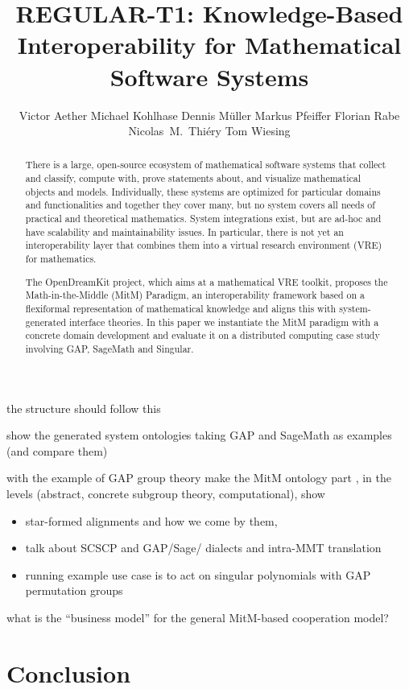 \documentclass{llncs}
\title{REGULAR-T1: Knowledge-Based Interoperability for Mathematical Software Systems}
\author{
Victor Aether\inst{2} 
 Michael Kohlhase\inst{1} 
Dennis M\"uller\inst{1} 
Markus Pfeiffer\inst{2} 
Florian Rabe\inst{2} 
Nicolas~M.~Thiéry\inst{3} 
Tom Wiesing\inst{2}
}
\institute{
   FAU Erlangen-N\"urnberg
   \and University of St~Andrews 
   \and Universit\'e Paris-Sud
}
\begin{document}
\maketitle
\begin{abstract}
  There is a large, open-source ecosystem of mathematical software systems that collect and
  classify, compute with, prove statements about, and visualize mathematical objects and
  models. Individually, these systems are optimized for particular domains and
  functionalities and together they cover many, but no system covers all needs of
  practical and theoretical mathematics. System integrations exist, but are ad-hoc and
  have scalability and maintainability issues. In particular, there is not yet an
  interoperability layer that combines them into a virtual research environment (VRE) for
  mathematics.
  
  The OpenDreamKit project, which aims at a mathematical VRE toolkit, proposes the
  Math-in-the-Middle (MitM) Paradigm, an interoperability framework based on a flexiformal
  representation of mathematical knowledge and aligns this with system-generated interface
  theories. In this paper we instantiate the MitM paradigm with a concrete domain
  development and evaluate it on a distributed computing case study involving GAP,
  SageMath and Singular. 
\end{abstract}



\begin{todolist}{the structure should follow this}
\item show the generated system ontologies taking GAP and SageMath as examples (and
  compare them)
\item with the example of GAP group theory make the MitM ontology part , in the levels
  (abstract, concrete subgroup theory, computational), show 
  \begin{itemize}
  \item star-formed alignments and how we come by them, 
  \item talk about SCSCP and GAP/Sage/ dialects and intra-MMT translation
  \item running example use case is to act on singular polynomials with GAP permutation
    groups
  \end{itemize}
\item what is the ``business model'' for the general MitM-based cooperation model? 
\end{todolist}

\section{Conclusion}\label{sec:concl}
\printbibliography
\end{document}
